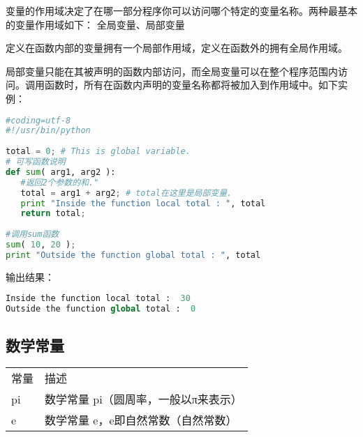 变量的作用域决定了在哪一部分程序你可以访问哪个特定的变量名称。两种最基本的变量作用域如下：
全局变量、局部变量

定义在函数内部的变量拥有一个局部作用域，定义在函数外的拥有全局作用域。

局部变量只能在其被声明的函数内部访问，而全局变量可以在整个程序范围内访问。调用函数时，所有在函数内声明的变量名称都将被加入到作用域中。如下实例：
\begin{lstlisting}[language=Python]
#coding=utf-8
#!/usr/bin/python
 
total = 0; # This is global variable.
# 可写函数说明
def sum( arg1, arg2 ):
   #返回2个参数的和."
   total = arg1 + arg2; # total在这里是局部变量.
   print "Inside the function local total : ", total
   return total;
 
#调用sum函数
sum( 10, 20 );
print "Outside the function global total : ", total 
\end{lstlisting}
输出结果：
\begin{lstlisting}[language=Python]
Inside the function local total :  30
Outside the function global total :  0
\end{lstlisting}





\subsection{数学常量}
\begin{tabular}{l|l}
常量&	描述\\
pi	&数学常量 pi（圆周率，一般以π来表示）\\
e	&数学常量 e，e即自然常数（自然常数）
\end{tabular}



